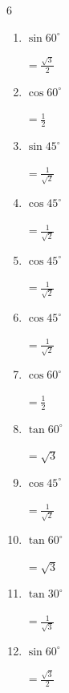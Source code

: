 \begin{multicols}{6}
\begin{enumerate}
        $\displaystyle =\frac{1}{\sqrt{2}}$

  \item $\displaystyle \sin{60^\circ}$

        $\displaystyle =\frac{\sqrt{3}}{2}$

  \item $\displaystyle \cos{60^\circ}$

        $\displaystyle =\frac{1}{2}$

  \item $\displaystyle \sin{45^\circ}$

        $\displaystyle =\frac{1}{\sqrt{2}}$

  \item $\displaystyle \cos{45^\circ}$

        $\displaystyle =\frac{1}{\sqrt{2}}$

  \item $\displaystyle \cos{45^\circ}$

        $\displaystyle =\frac{1}{\sqrt{2}}$

  \item $\displaystyle \cos{45^\circ}$

        $\displaystyle =\frac{1}{\sqrt{2}}$

\columnbreak %

\resetques

  \item $\displaystyle \cos{60^\circ}$

        $\displaystyle =\frac{1}{2}$

  \item $\displaystyle \tan{60^\circ}$

        $\displaystyle =\sqrt{3}$

  \item $\displaystyle \cos{45^\circ}$

        $\displaystyle =\frac{1}{\sqrt{2}}$

  \item $\displaystyle \tan{60^\circ}$

        $\displaystyle =\sqrt{3}$

  \item $\displaystyle \tan{30^\circ}$

        $\displaystyle =\frac{1}{\sqrt{3}}$

  \item $\displaystyle \sin{60^\circ}$

        $\displaystyle =\frac{\sqrt{3}}{2}$


\end{enumerate}
\end{multicols}
